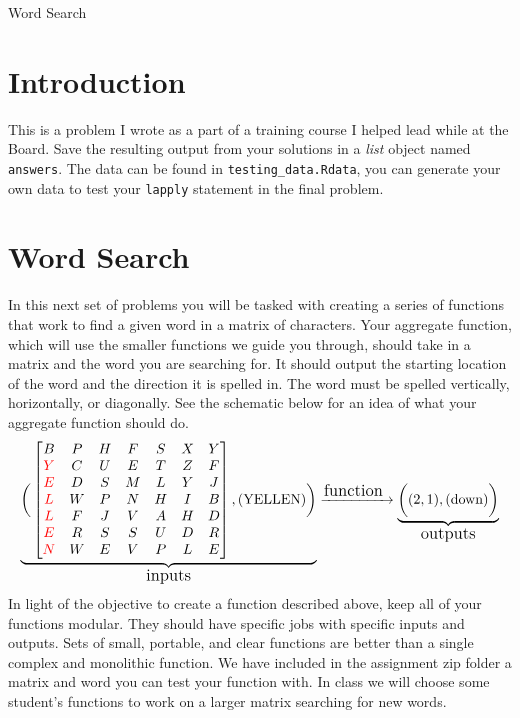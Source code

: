 \documentclass[11pt]{article}
\newcounter{prob} %
\begin{document}
\begin{center}
{\Large Word Search}
\bigskip
\end{center}

\section{Introduction}
\par
This is a problem I wrote as a part of a training course I helped lead while at the Board.
Save the resulting output from your solutions in a \textit{list}
 object named \texttt{answers}. The data can be found in \texttt{testing\_data.Rdata}, you can generate your own data to test your
 \texttt{lapply} statement in the final problem.

\section{Word Search}
In this next set of problems you will be tasked with creating a series of functions that work to find a given word in a matrix of characters. Your aggregate function, which will use the smaller functions we guide you through, should take in a matrix and the word you are searching for. It should output the starting location of the word and the direction it is spelled in. The word must be spelled vertically, horizontally, or diagonally. See the schematic below for an idea of what your aggregate function should do.
\[
\def\ba#1#2{a_{#1#2}}
\def\r{\color{red}}
\underbrace{ \bigg(
\begin{bmatrix}
B & P & H & F & S & X & Y \\
\r{Y} & C & U & E & T & Z & F \\
\r{E} & D & S & M & L & Y & J \\
\r{L} & W & P & N & H & I & B \\
\r{L} & F & J & V & A & H & D \\
\r{E} & R & S & S & U & D & R \\
\r{N} & W & E & V & P & L & E
\end{bmatrix}
,\text{(YELLEN)} \bigg) }_{\text{{\large inputs}}}
\xrightarrow{\text{{\large function }}}
\underbrace{\bigg( (2,1), \text{(down)} \bigg) }_{\text{{\large outputs}}}
\]
In light of the objective to create a function described above, keep all of your functions modular. They should have specific jobs with specific inputs and outputs. Sets of small, portable, and clear functions are better than a single complex and monolithic function. We have included in the assignment zip folder a matrix and word you can test your function with. In class we will choose some student's functions to work on a larger matrix searching for new words.
\end{document}
